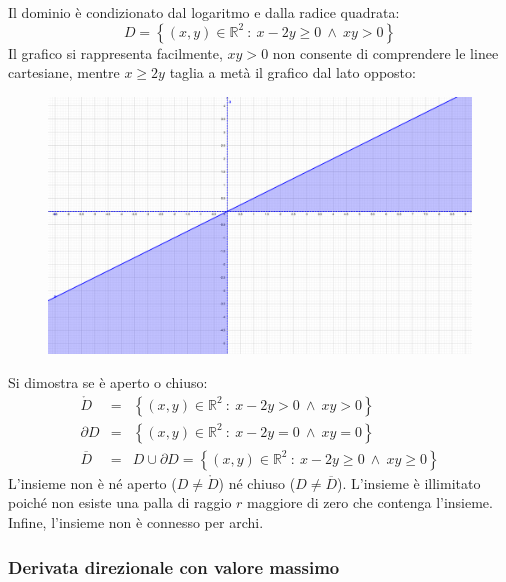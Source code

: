 \documentclass[a4paper]{article}
\begin{document}
	\noindent
	Il dominio è condizionato dal logaritmo e dalla radice quadrata:
	\begin{equation*}
		D = \left\{\left(x,y\right) \in \mathbb{R}^{2} \: : \: x-2y \ge 0 \: \land \: xy > 0\right\}
	\end{equation*}
	Il grafico si rappresenta facilmente, $xy>0$ non consente di comprendere le linee cartesiane, mentre $x \ge 2y$ taglia a metà il grafico dal lato opposto:
	\begin{figure}[!htp]
		\centering
		\includegraphics[width=\textwidth]{img/exercise/2023-03-03-A-ex3(a).pdf}
	\end{figure}

	\noindent
	Si dimostra se è aperto o chiuso:
	\begin{equation*}
		\begin{array}{rcl}
			\mathring{D} &=& \left\{\left(x,y\right) \in \mathbb{R}^{2} \: : \: x-2y > 0 \: \land \: xy > 0\right\} \\ [.3em]
			\partial D &=& \left\{\left(x,y\right) \in \mathbb{R}^{2} \: : \: x-2y = 0 \: \land \: xy = 0\right\} \\ [.3em]
			\overline{D} &=& D \cup \partial D = \left\{\left(x,y\right) \in \mathbb{R}^{2} \: : \: x-2y \ge 0 \: \land \: xy \ge 0\right\}
		\end{array}
	\end{equation*}
	L'insieme non è né aperto ($D \ne \mathring{D}$) né chiuso ($D \ne \overline{D}$). L'insieme è illimitato poiché non esiste una palla di raggio $r$ maggiore di zero che contenga l'insieme. Infine, l'insieme non è connesso per archi.

	\newpage

	\subsubsection{Derivata direzionale con valore massimo}
\end{document}
